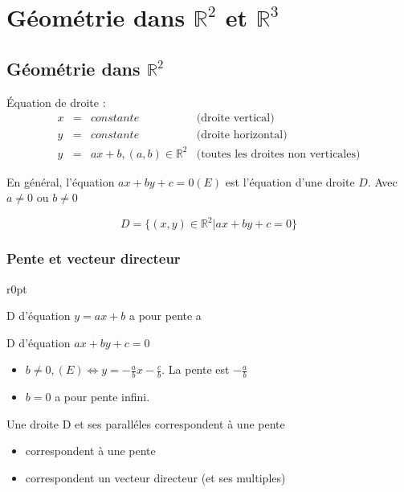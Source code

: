 \chapter{Géométrie dans $\mathbb{R}^2$ et $\mathbb{R}^3$}

\section{Géométrie dans $\mathbb{R}^2$}

Équation de droite : 
\[\begin{array}{rclr}
x &=& constante &\text{(droite vertical)}\\
y &=& constante & \text{(droite horizontal)} \\
y &=& ax+b, (a, b) \in \mathbb{R}^2 & \text{(toutes les droites non verticales)}
\end{array}\]

En général, l'équation $ax + by + c = 0 (E)$ est l'équation d'une droite $D$. Avec $a \neq 0$ ou $b \neq 0$

\[D = \{(x, y) \in \mathbb{R}^2 | ax + by + c = 0 \}\]

\subsection{Pente et vecteur directeur}

\begin{wrapfigure}[6]{r}{0pt}
\end{wrapfigure}

D d'équation $y =ax + b$ a pour pente a

D d'équation $ax + by + c = 0$
\begin{itemize}
	\item $b \neq 0, (E) \Leftrightarrow y = -\frac{a}{b}x - \frac{c}{b}$. La pente est $-\frac{a}{b}$
	\item $b=0$ a pour pente infini.
\end{itemize}

Une droite D et ses paralléles correspondent à une pente
\begin{itemize}
	\item correspondent à une pente
	\item correspondent un vecteur directeur (et ses multiples)
\end{itemize}

